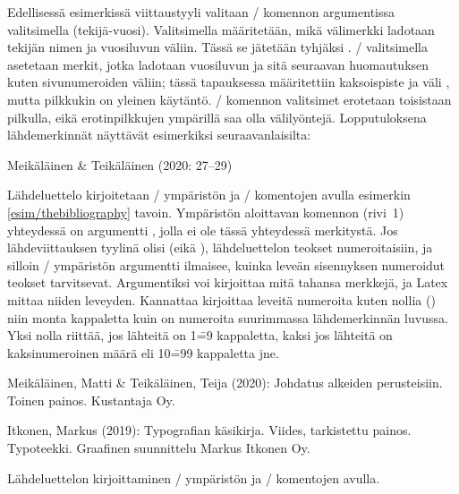\noindent
Edellisessä esimerkissä viittaustyyli valitaan \-/
komennon argumentissa valitsimella 
(tekijä\--vuosi). Valitsimella  määritetään, mikä
välimerkki ladotaan tekijän nimen ja vuosiluvun väliin. Tässä se
jätetään tyhjäksi \koodi{\{\}}. \-/ valitsimella
asetetaan merkit, jotka ladotaan vuosiluvun ja sitä seuraavan
huomautuksen kuten sivunumeroiden väliin; tässä tapauksessa määritettiin
kaksoispiste ja väli \koodi{\{:~\}}, mutta pilkkukin on yleinen
käytäntö. \-/ komennon valitsimet erotetaan
toisistaan pilkulla, eikä erotinpilkkujen ympärillä saa olla
välilyöntejä. Lopputuloksena lähdemerkinnät näyttävät esimerkiksi
seuraavanlaisilta:

\begin{koodilohkosis}
\citet*[27--29]{johdatus} %
\end{koodilohkosis}

\begin{tulossis}
  Meikäläinen \& Teikäläinen (2020: 27--29)
\end{tulossis}

\noindent
Lähdeluettelo kirjoitetaan \-/ ympäristön ja
\-/ komentojen avulla esimerkin
\ref{esim/thebibliography} tavoin. Ympäristön aloittavan komennon
(rivi~1) yhteydessä on argumentti , jolla ei ole tässä
yhteydessä merkitystä. Jos lähdeviittauksen tyylinä olisi
 (eikä ), lähdeluettelon teokset
numeroitaisiin, ja silloin \-/ ympäristön
argumentti ilmaisee, kuinka leveän sisennyksen numeroidut teokset
tarvitsevat. Argumentiksi voi kirjoittaa mitä tahansa merkkejä, ja Latex
mittaa niiden leveyden. Kannattaa kirjoittaa leveitä numeroita kuten
nollia () niin monta kappaletta kuin on numeroita suurimmassa
lähdemerkinnän luvussa. Yksi nolla riittää, jos lähteitä on 1\==9
kappaletta, kaksi jos lähteitä on kaksinumeroinen määrä eli 10\==99
kappaletta jne.

\begin{esimerkki*}

\begin{koodilohko}
\begin{thebibliography}{00}

  Meikäläinen, Matti \& Teikäläinen, Teija (2020): Johdatus alkeiden
  perusteisiin. Toinen painos. Kustantaja Oy.

 Itkonen, Markus (2019): Typografian
  käsikirja. Viides, tarkistettu painos. Typoteekki. Graafinen
  suunnittelu Markus Itkonen Oy.

\end{thebibliography}
\end{koodilohko}
  \caption{Lähdeluettelon kirjoittaminen \-/
    ympäristön ja \-/ komentojen avulla.}
  \label{esim/thebibliography}
\end{esimerkki*}

